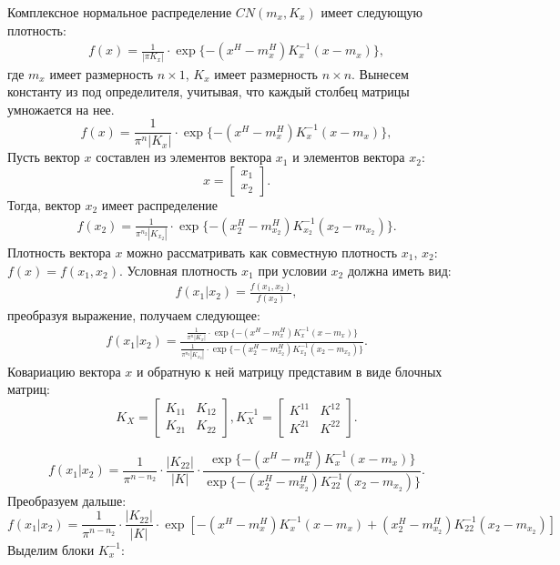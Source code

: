 \documentclass[11pt]{article}
\begin{document}
\begin{center}
\fontsize{20}{23}\selectfont {}
\end{center}
Комплексное нормальное распределение $CN(m_x,K_x)$  имеет следующую плотность:
\begin{gather}
f(x) = \frac{1}{|\pi K_x|} \cdot \exp\{-(x^H-m_x^H)K_x^{-1}(x-m_x)\},
\end{gather}
где $m_x$ имеет размерность $n\times 1$, $K_x$ имеет размерность $n\times n$.
Вынесем константу из под определителя, учитывая, что каждый столбец матрицы умножается на нее.
$$
f(x) = \frac{1}{\pi^n |K_x|} \cdot \exp\{-(x^H-m_x^H)K_x^{-1}(x-m_x)\},
$$
Пусть вектор $x$ составлен из элементов вектора $x_1$ и элементов вектора $x_2$:
$$
x=\begin{bmatrix}
x_1\\
x_2
\end{bmatrix}.
$$
Тогда, вектор $x_2$ имеет распределение
\begin{gather}
f(x_2) = \frac{1}{\pi^{n_2} |K_{x_2}|} \cdot \exp\{-(x_2^H-m_{x_2}^H)K_{x_2}^{-1}(x_2-m_{x_2})\}.
\end{gather}
Плотность вектора $x$ можно рассматривать как совместную плотность $x_1$, $x_2$: $f(x)=f(x_1,x_2).$
Условная плотность $x_1$ при условии $x_2$ должна иметь вид:
\begin{gather}
f(x_1|x_2)=\frac{f(x_1,x_2)}{f(x_2)},
\end{gather}
преобразуя выражение, получаем следующее:
\begin{gather}
f(x_1|x_2)=\frac{\frac{1}{\pi^n |K_x|} \cdot \exp\{-(x^H-m_x^H)K_x^{-1}(x-m_x)\}}{\frac{1}{\pi^{n_2} |K_{x_2}|} \cdot \exp\{-(x_2^H-m_{x_2}^H)K_{x_2}^{-1}(x_2-m_{x_2})\}}.
\end{gather}
Ковариацию вектора $x$ и обратную к ней матрицу представим в виде блочных матриц:
$$
K_X=\begin{bmatrix}
K_{11}&K_{12}\\
K_{21}&K_{22}
\end{bmatrix}, 
K_X^{-1}=\begin{bmatrix}
K^{11}&K^{12}\\
K^{21}&K^{22}
\end{bmatrix}.
$$

$$
f(x_1|x_2)=\frac{1}{\pi^{n-n_2}}\cdot \frac{|K_{22}|}{|K|}\cdot\frac{\exp\{-(x^H-m_x^H)K_x^{-1}(x-m_x)\}}{\exp\{-(x_2^H-m_{x_2}^H)K_{22}^{-1}(x_2-m_{x_2})\}}.
$$
Преобразуем дальше:
$$
f(x_1|x_2)=\frac{1}{\pi^{n-n_2}}\cdot \frac{|K_{22}|}{|K|}\cdot \exp[-(x^H-m_x^H)K_x^{-1}(x-m_x)+(x_2^H-m_{x_2}^H)K_{22}^{-1}(x_2-m_{x_2})]
$$
Выделим блоки $K_x^{-1}$:
\end{document}
